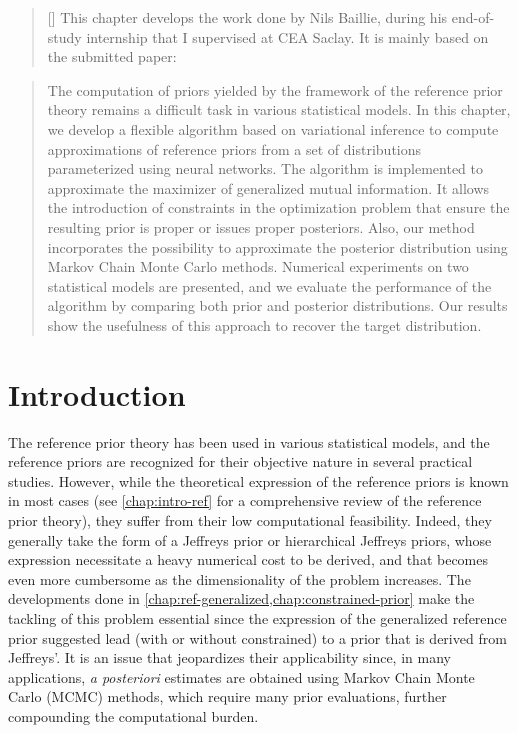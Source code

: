 

\begin{abstract}[\hspace*{-10pt}]
    This chapter develops the work
    done by Nils Baillie, during his end-of-study internship that I supervised at CEA Saclay.
    It is mainly based on the submitted paper: 
\end{abstract}

\begin{abstract}
    The computation of priors yielded by the framework of the reference prior theory remains a difficult task in various statistical models. 
    In this chapter, we develop a flexible algorithm based on variational inference to compute approximations of reference priors from a set of distributions parameterized using neural networks. The algorithm is implemented to approximate the maximizer of generalized mutual information. It allows the introduction of constraints in the optimization problem that ensure the resulting prior is proper or issues proper posteriors. Also, our method incorporates the possibility to approximate the posterior distribution using Markov Chain Monte Carlo methods. Numerical experiments on two statistical models are presented, 
    and we evaluate the performance of the algorithm by comparing both prior and posterior distributions.
    Our results show the usefulness of this approach to recover the target distribution.
\end{abstract}

\minitoc


\section{Introduction}\label{sec:VARP:intro}


The reference prior theory %
has been used in various statistical models, and the reference priors are recognized for their objective nature in several practical studies.
However,
while the theoretical expression of the reference priors is known in most cases (see \cref{chap:intro-ref} for a comprehensive review of the reference prior theory), they suffer from their low computational feasibility.
Indeed, they generally take the form of a Jeffreys prior or hierarchical Jeffreys priors, whose expression necessitate a heavy numerical cost to be derived, and that becomes even more cumbersome as the dimensionality of the problem increases.
The developments done in \cref{chap:ref-generalized,chap:constrained-prior} make the tackling of this problem essential since the expression of the generalized reference prior suggested lead (with or without constrained) to a prior that is derived from Jeffreys'.
It is an issue that jeopardizes %
their applicability since, in many applications, \emph{a posteriori} estimates are obtained using Markov Chain Monte Carlo (MCMC) methods, which require many prior evaluations, further compounding the computational burden.

